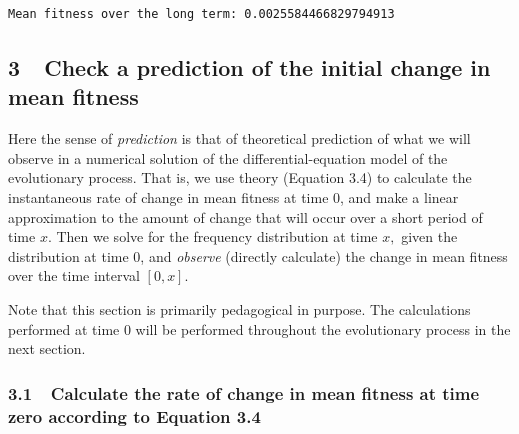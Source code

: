 \documentclass[11pt]{article}
\begin{document}
    \begin{Verbatim}[commandchars=\\\{\}]
Mean fitness over the long term: 0.0025584466829794913

    \end{Verbatim}

    \subsection{3~~Check a prediction of the initial change in mean
fitness}\label{check-a-prediction-of-the-initial-change-in-mean-fitness}

Here the sense of \emph{prediction} is that of theoretical prediction of
what we will observe in a numerical solution of the
differential-equation model of the evolutionary process. That is, we use
theory (Equation 3.4) to calculate the instantaneous rate of change in
mean fitness at time 0, and make a linear approximation to the amount of
change that will occur over a short period of time \(x.\) Then we solve
for the frequency distribution at time \(x,\) given the distribution at
time 0, and \emph{observe} (directly calculate) the change in mean
fitness over the time interval \([0, x].\)

Note that this section is primarily pedagogical in purpose. The
calculations performed at time 0 will be performed throughout the
evolutionary process in the next section.

    \subsubsection{3.1~~Calculate the rate of change in mean fitness at time
zero according to Equation
3.4}\label{calculate-the-rate-of-change-in-mean-fitness-at-time-zero-according-to-equation-3.4}
\end{document}
